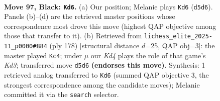 \documentclass[11pt]{article}
\begin{document}
\begin{figure}[p]\centering
\begin{subfigure}{0.46\textwidth}\centering
\resizebox{\linewidth}{!}{%
\newchessgame
\chessboard[
  setfen={8/5r2/p7/P1pk1p1p/1p3P1P/4P1P1/1PR5/6K1 b - - 6 97},
  showmover=false,
  pgfstyle=straightmove, color=movearrow, markmove={d5-d6}
]}
\caption{}
\end{subfigure}\hfill
\begin{subfigure}{0.46\textwidth}\centering
\resizebox{\linewidth}{!}{%
\newchessgame
\chessboard[
  setfen={8/1p6/p1pr1kp1/P6p/1P3P1P/3KP3/8/1R6 w - - 15 90},
  showmover=false,
  pgfstyle=straightmove, color=movearrow, markmove={d3-c4}
]}
\caption{}
\end{subfigure}
\\[4pt]

\caption{\textbf{Move 97, Black: \texttt{Kd6}.} (a) Our position; Melanie plays \texttt{Kd6} (\texttt{d5d6}). Panels (b)--(d) are the retrieved master positions whose correspondence most drove this move (highest QAP objective among those that transfer to it). (b) Retrieved from \texttt{lichess\_elite\_2025-11\_p0000\#884} (ply 178) [structural distance $d$=25, QAP obj=3]: the master played \texttt{Kc4}; under $\mu$ our \emph{Kd4} plays the role of that game's \emph{Kd3}; transferred move \texttt{d5d6} \textbf{(endorses this move)}. Synthesis: 1 retrieved analog transferred to \texttt{Kd6} (summed QAP objective 3, the strongest correspondence among the candidate moves); Melanie committed it via the \texttt{search} selector.}
\label{fig:thought-m193}
\end{figure}

\clearpage
\end{document}
